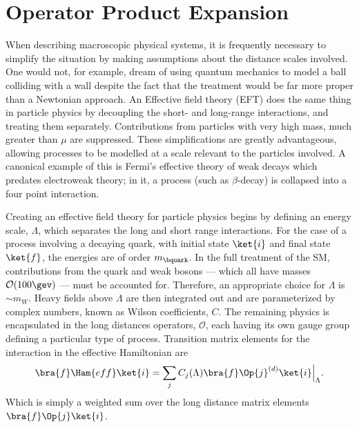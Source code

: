 \section{Operator Product Expansion}



When describing macroscopic physical systems, it is frequently necessary to simplify the situation by making
assumptions about the distance scales involved.
One would not, for example, dream of using quantum mechanics to model a ball colliding with a wall
despite the fact that the treatment would be far more proper than a Newtonian approach.
An Effective field theory (EFT) does the same thing in particle physics
by decoupling the short- and long-range interactions, and treating them separately.
Contributions from particles with very high mass, much greater than $\mu$ are suppressed.
These simplifications are greatly advantageous, allowing processes to be modelled at a scale
relevant to the particles involved.
A canonical example of this is Fermi's effective theory of weak decays which predates electroweak
theory; in it, a process (such as $\beta$-decay) is collapsed into a four point interaction.

Creating an effective field theory for particle physics begins by defining an energy scale,
$\Lambda$, which separates the long and short range interactions.
For the case of a process involving a decaying \bquark quark, with initial state $\ket{i}$ and
final state $\ket{f}$,
the energies are of order $m_\bquark$.
In the full treatment of the SM, contributions from the \tquark quark and weak bosons --- which all
have masses $\mathcal{O}(100\gev)$ --- must be accounted for.
Therefore, an appropriate choice for $\Lambda$ is $\sim m_W$.
Heavy fields above $\Lambda$ are then integrated out and are parameterized by complex numbers,
known as Wilson coefficients, $C$.
The remaining physics is encapsulated in the long distances operators, $\mathcal{O}$, each having
its own gauge group defining a particular type of process.
Transition matrix elements for the interaction in the effective Hamiltonian are
\begin{equation}
  \bra{f}\Ham{eff}\ket{i} =
  \sum_j C_j(\Lambda)\bra{f}\Op{j}^{(d)}\ket{i}\Big|_{\Lambda}.
  \label{eq:th:opeham}
\end{equation}
Which is simply a weighted sum over the long distance matrix elements $\bra{f}\Op{j}\ket{i}$.

